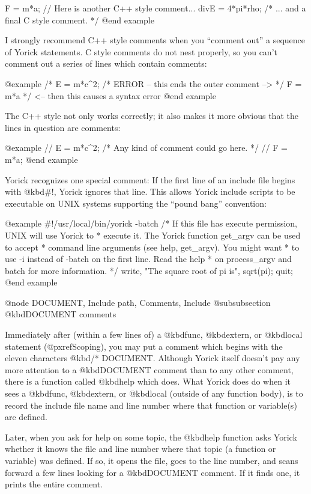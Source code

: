 {F = m*a;         // Here is another C++ style comment...
divE = 4*pi*rho; /* ... and a final C style comment. */
@end example

I strongly recommend C++ style comments when you ``comment
out'' a sequence of Yorick statements.  C style comments do not nest
properly, so you can't comment out a series of lines which contain
comments:

@example
/*
E = m*c^2;   /* ERROR -- this ends the outer comment --> */
F = m*a
*/ <-- then this causes a syntax error
@end example

The C++ style not only works correctly; it also makes it more obvious
that the lines in question are comments:

@example
// E = m*c^2;   /* Any kind of comment could go here.  */
// F = m*a;
@end example

Yorick recognizes one special comment: If the first line of an include
file begins with @kbd{#!}, Yorick ignores that line.  This allows Yorick
include scripts to be executable on UNIX systems supporting the ``pound
bang'' convention:

@example
#!/usr/local/bin/yorick -batch
/* If this file has execute permission, UNIX will use Yorick to
 * execute it.  The Yorick function get_argv can be used to accept
 * command line arguments (see help, get_argv).  You might want
 * to use -i instead of -batch on the first line.  Read the help
 * on process_argv and batch for more information.  */
write, "The square root of pi is", sqrt(pi);
quit;
@end example


@node DOCUMENT, Include path, Comments, Include
@subsubsection @kbd{DOCUMENT} comments

Immediately after (within a few lines of) a @kbd{func}, @kbd{extern}, or
@kbd{local} statement (@pxref{Scoping}), you may put a comment which
begins with the eleven characters @kbd{/* DOCUMENT}.  Although Yorick
itself doesn't pay any more attention to a @kbd{DOCUMENT} comment than
to any other comment, there is a function called @kbd{help} which does.
What Yorick does do when it sees a @kbd{func}, @kbd{extern}, or
@kbd{local} (outside of any function body), is to record the include
file name and line number where that function or variable(s) are
defined.

Later, when you ask for help on some topic, the @kbd{help} function
asks Yorick whether it knows the file and line number where that topic
(a function or variable) was defined.  If so, it opens the file, goes
to the line number, and scans forward a few lines looking for a
@kbd{DOCUMENT} comment.  If it finds one, it prints the entire
comment.

}
